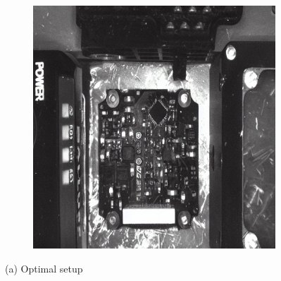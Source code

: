 \documentclass[12pt,DIV14,BCOR12mm,a4paper,footinclude=false,headinclude,parskip=half-,twoside,openright,cleardoublepage=empty,toc=index,bibliography=totoc,listof=totoc]{scrreprt}
\numberwithin{equation}{chapter}
\begin{document}
\begin{figure}
\begin{subfigure}[t]{0.24\textwidth}
        \includegraphics[width=\textwidth]{../media/diff_pcb_optimal_fake.png}
    \end{subfigure}
    \caption*{(a) Optimal setup}

    \vspace{0.3cm} %


\end{figure}
\end{document}
